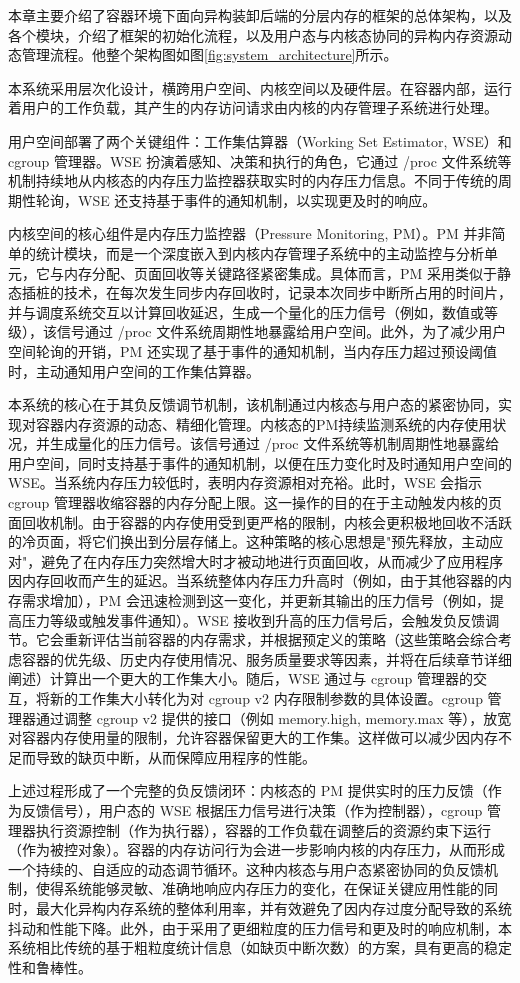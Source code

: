 本章主要介绍了容器环境下面向异构装卸后端的分层内存的框架的总体架构，以及各个模块，介绍了框架的初始化流程，以及用户态与内核态协同的异构内存资源动态管理流程。他整个架构图如图\ref{fig:system_architecture}所示。

本系统采用层次化设计，横跨用户空间、内核空间以及硬件层。在容器内部，运行着用户的工作负载，其产生的内存访问请求由内核的内存管理子系统进行处理。

用户空间部署了两个关键组件：工作集估算器（Working Set Estimator, WSE）和 cgroup 管理器。WSE 扮演着感知、决策和执行的角色，它通过 /proc 文件系统等机制持续地从内核态的内存压力监控器获取实时的内存压力信息。不同于传统的周期性轮询，WSE 还支持基于事件的通知机制，以实现更及时的响应。

内核空间的核心组件是内存压力监控器（Pressure Monitoring, PM）。PM 并非简单的统计模块，而是一个深度嵌入到内核内存管理子系统中的主动监控与分析单元，它与内存分配、页面回收等关键路径紧密集成。具体而言，PM 采用类似于静态插桩的技术，在每次发生同步内存回收时，记录本次同步中断所占用的时间片，并与调度系统交互以计算回收延迟，生成一个量化的压力信号（例如，数值或等级），该信号通过 /proc 文件系统周期性地暴露给用户空间。此外，为了减少用户空间轮询的开销，PM 还实现了基于事件的通知机制，当内存压力超过预设阈值时，主动通知用户空间的工作集估算器。

本系统的核心在于其负反馈调节机制，该机制通过内核态与用户态的紧密协同，实现对容器内存资源的动态、精细化管理。内核态的PM持续监测系统的内存使用状况，并生成量化的压力信号。该信号通过 /proc 文件系统等机制周期性地暴露给用户空间，同时支持基于事件的通知机制，以便在压力变化时及时通知用户空间的WSE。当系统内存压力较低时，表明内存资源相对充裕。此时，WSE 会指示 cgroup 管理器收缩容器的内存分配上限。这一操作的目的在于主动触发内核的页面回收机制。由于容器的内存使用受到更严格的限制，内核会更积极地回收不活跃的冷页面，将它们换出到分层存储上。这种策略的核心思想是"预先释放，主动应对"，避免了在内存压力突然增大时才被动地进行页面回收，从而减少了应用程序因内存回收而产生的延迟。当系统整体内存压力升高时（例如，由于其他容器的内存需求增加），PM 会迅速检测到这一变化，并更新其输出的压力信号（例如，提高压力等级或触发事件通知）。WSE 接收到升高的压力信号后，会触发负反馈调节。它会重新评估当前容器的内存需求，并根据预定义的策略（这些策略会综合考虑容器的优先级、历史内存使用情况、服务质量要求等因素，并将在后续章节详细阐述）计算出一个更大的工作集大小。随后，WSE 通过与 cgroup 管理器的交互，将新的工作集大小转化为对 cgroup v2 内存限制参数的具体设置。cgroup 管理器通过调整 cgroup v2 提供的接口（例如 memory.high, memory.max 等），放宽对容器内存使用量的限制，允许容器保留更大的工作集。这样做可以减少因内存不足而导致的缺页中断，从而保障应用程序的性能。

上述过程形成了一个完整的负反馈闭环：内核态的 PM 提供实时的压力反馈（作为反馈信号），用户态的 WSE 根据压力信号进行决策（作为控制器），cgroup 管理器执行资源控制（作为执行器），容器的工作负载在调整后的资源约束下运行（作为被控对象）。容器的内存访问行为会进一步影响内核的内存压力，从而形成一个持续的、自适应的动态调节循环。这种内核态与用户态紧密协同的负反馈机制，使得系统能够灵敏、准确地响应内存压力的变化，在保证关键应用性能的同时，最大化异构内存系统的整体利用率，并有效避免了因内存过度分配导致的系统抖动和性能下降。此外，由于采用了更细粒度的压力信号和更及时的响应机制，本系统相比传统的基于粗粒度统计信息（如缺页中断次数）的方案，具有更高的稳定性和鲁棒性。
